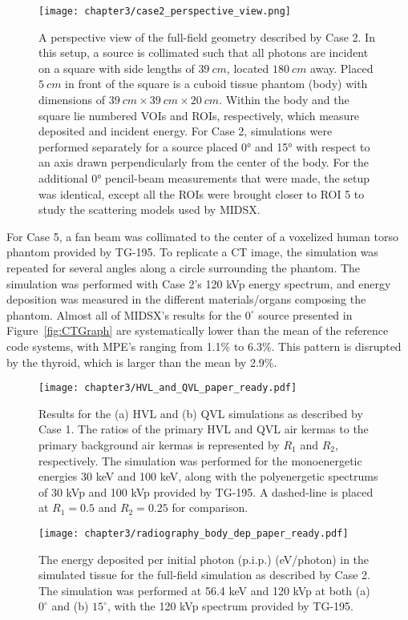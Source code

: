 \begin{figure}[H]
    \centering
    \texttt{[image: chapter3/case2\_perspective\_view.png]}
    \caption{A perspective view of the full-field geometry described by Case 2. In this setup, a source is collimated such that all photons are incident on a square with side lengths of $\qty{39}{cm}$, located $\qty{180}{cm}$ away. Placed $\qty{5}{cm}$ in front of the square is a cuboid tissue phantom (body) with dimensions of $\qty{39}{cm} \times \qty{39}{cm} \times \qty{20}{cm}$. Within the body and the square lie numbered VOIs and ROIs, respectively, which measure deposited and incident energy. For Case 2, simulations were performed separately for a source placed \ang{0} and \ang{15} with respect to an axis drawn perpendicularly from the center of the body. For the additional $\ang{0}$ pencil-beam measurements that were made, the setup was identical, except all the ROIs were brought closer to ROI 5 to study the scattering models used by MIDSX.} 
\end{figure}

\par For Case 5, a fan beam was collimated to the center of a voxelized human torso phantom provided by TG-195. To replicate a CT image, the simulation was repeated for several angles along a circle surrounding the phantom. The simulation was performed with Case 2's 120 kVp energy spectrum, and energy deposition was measured in the different materials/organs composing the phantom. Almost all of MIDSX's results for the $0^\circ$ source presented in Figure~\ref{fig:CTGraph} are systematically lower than the mean of the reference code systems, with MPE's ranging from 1.1\% to 6.3\%. This pattern is disrupted by the thyroid, which is larger than the mean by 2.9\%. 


\begin{figure}[H]
    \centering
	\texttt{[image: chapter3/HVL\_and\_QVL\_paper\_ready.pdf]}
	\caption{Results for the (a) HVL and (b) QVL simulations as described by Case 1. The ratios of the primary HVL and QVL air kermas to the primary background air kermas is represented by $R_1$ and $R_2$, respectively. The simulation was performed for the monoenergetic energies 30 keV and 100 keV, along with the polyenergetic spectrums of 30 kVp and 100 kVp provided by TG-195. A dashed-line is placed at $R_1 = 0.5$ and $R_2 = 0.25$ for comparison.}
	\label{fig:HVLGraph}
\end{figure}

\begin{figure}[H]
    \centering
	\texttt{[image: chapter3/radiography\_body\_dep\_paper\_ready.pdf]}
	\caption{The energy deposited per initial photon (p.i.p.) (eV/photon) in the simulated tissue for the full-field simulation as described by Case 2. The simulation was performed at 56.4 keV and 120 kVp at both (a) $0^\circ$ and (b) $15^\circ$, with the 120 kVp spectrum provided by TG-195.}
 	\label{fig:BDGraph}
\end{figure}


